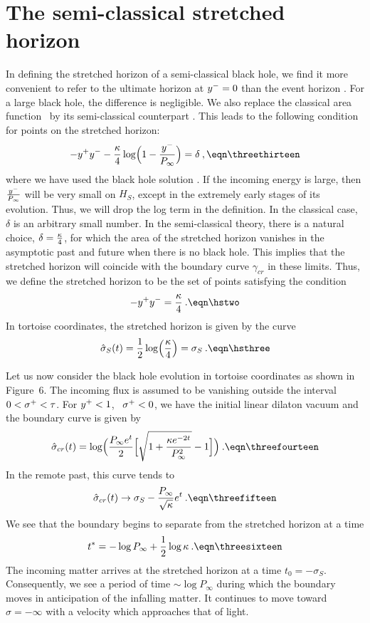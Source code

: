 \section{The semi-classical stretched horizon}

In defining the stretched horizon of a semi-classical black hole, we
find it more convenient to refer to the ultimate horizon at $\ym = 0$
than the event horizon \yme .  For a large black hole, the difference
is negligible.  We also replace the classical area function \areaone\
by its semi-classical counterpart \areatwo .  This leads to the
following condition for points on the stretched horizon:
$$
-\yp \ym - {\kappa \over 4} \log \Bigl( 1 -
{\ym \over P_{\infty}} \Bigr) = \delta \>,
\eqn\threethirteen
$$
where we have used the black hole solution \soli .  If the incoming
energy is large, then ${\ym \over P_{\infty}}$ will be very small on
$H_S$, except in the extremely early stages of its evolution.  Thus,
we will drop the log term in the definition.  In the classical case,
$\delta$ is an arbitrary small number.  In the semi-classical theory,
there is a natural choice, $\delta ={\kappa\over 4}$, for which the
area of the stretched horizon vanishes in the asymptotic past and
future when there is no black hole.  This implies that the stretched
horizon will coincide with the boundary curve $\gamma_{cr}$ in these
limits.  Thus, we define the stretched horizon to be the set of
points satisfying the condition
$$
- \yp \ym = {\kappa\over 4} \>.
\eqn\hstwo
$$
In tortoise coordinates, the stretched horizon is given by the curve
$$
{\hat \sigma}_S (t)
= \half \log \Bigl({\kappa \over 4} \Bigr)
= \sigma_S  \>.
\eqn\hsthree
$$

Let us now consider the black hole evolution in tortoise coordinates
as shown in Figure~6.  The incoming flux is assumed to be vanishing
outside the interval $0<\sp<\tau$.  For $\yp < 1$, \ie\ $\sp < 0$, we
have the initial linear dilaton vacuum and the boundary curve is
given by
$$
{\hat \sigma}_{cr} (t) = \log \Bigl( {P_{\infty}
e^t \over 2} \Bigl[ \sqrt{1 + {\kappa e^{-2t}
\over P^2_{\infty}}} - 1 \Bigr] \Bigr) \>.
\eqn\threefourteen
$$
In the remote past, this curve tends to
$$
{\hat \sigma}_{cr} (t) \rightarrow \sigma_S
- {P_{\infty} \over \sqrt{\kappa}} e^t \>.
\eqn\threefifteen
$$
We see that the boundary begins to separate from the stretched
horizon at a time
$$
t^* = -\log P_{\infty} + \half \log \kappa \>.
\eqn\threesixteen
$$
The incoming matter arrives at the stretched horizon at a time $t_0
=-\sigma_S$.  Consequently, we see a period of time $\sim \log
P_{\infty}$ during which the boundary moves in anticipation of the
infalling matter.  It continues to move toward $\sigma = -\infty$
with a velocity which approaches that of light.


